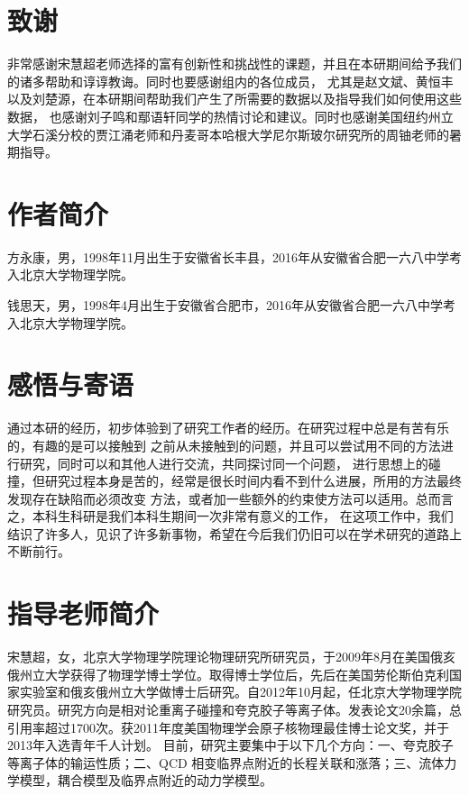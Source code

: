 \documentclass[aps,pre,12pt,preprint,onecolumn,showpacs,showkeys]{revtex4-1}
\begin{document}
\section{致谢}
非常感谢宋慧超老师选择的富有创新性和挑战性的课题，并且在本研期间给予我们的诸多帮助和谆谆教诲。同时也要感谢组内的各位成员，
尤其是赵文斌、黄恒丰以及刘楚源，在本研期间帮助我们产生了所需要的数据以及指导我们如何使用这些数据，
也感谢刘子鸣和鄢语轩同学的热情讨论和建议。同时也感谢美国纽约州立大学石溪分校的贾江涌老师和丹麦哥本哈根大学尼尔斯玻尔研究所的周铀老师的暑期指导。



%
%
%
%
%
%
%
%
%
%
%
%
%
%


\section{\heiti{}作者简介}
方永康，男，1998年11月出生于安徽省长丰县，2016年从安徽省合肥一六八中学考入北京大学物理学院。\par
钱思天，男，1998年4月出生于安徽省合肥市，2016年从安徽省合肥一六八中学考入北京大学物理学院。
\section{\heiti{}感悟与寄语}
通过本研的经历，初步体验到了研究工作者的经历。在研究过程中总是有苦有乐的，有趣的是可以接触到
之前从未接触到的问题，并且可以尝试用不同的方法进行研究，同时可以和其他人进行交流，共同探讨同一个问题，
进行思想上的碰撞，但研究过程本身是苦的，经常是很长时间内看不到什么进展，所用的方法最终发现存在缺陷而必须改变
方法，或者加一些额外的约束使方法可以适用。总而言之，本科生科研是我们本科生期间一次非常有意义的工作，
在这项工作中，我们结识了许多人，见识了许多新事物，希望在今后我们仍旧可以在学术研究的道路上不断前行。

\section{\heiti{}指导老师简介}
宋慧超，女，北京大学物理学院理论物理研究所研究员，于2009年8月在美国俄亥俄州立大学获得了物理学博士学位。取得博士学位后，先后在美国劳伦斯伯克利国家实验室和俄亥俄州立大学做博士后研究。自2012年10月起，任北京大学物理学院研究员。研究方向是相对论重离子碰撞和夸克胶子等离子体。发表论文20余篇，总引用率超过1700次。获2011年度美国物理学会原子核物理最佳博士论文奖，并于2013年入选青年千人计划。
目前，研究主要集中于以下几个方向：一、夸克胶子等离子体的输运性质；二、QCD 相变临界点附近的长程关联和涨落；三、流体力学模型，耦合模型及临界点附近的动力学模型。
\end{document}
